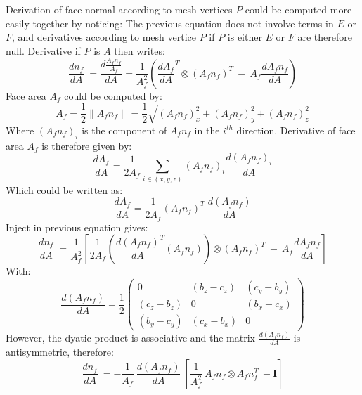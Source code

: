 \documentclass[11pt]{article}
\begin{document}
Derivation of face normal according to mesh vertices $P$ could be computed more easily together by noticing:
The previous equation does not involve terms in $E$ or $F$, and derivatives according to mesh vertice $P$ if $P$ is either $E$ or $F$ are therefore null. Derivative if $P$ is $A$ then writes:
\begin{equation}
\frac{d n_f}{dA}\ = \frac{d \frac{A_f n_f}{A_f}}{dA} = 
\frac{1}{A_f^2} \left( \frac{d A_f}{dA}^T \otimes (A_f n_f)^T\ -\ A_f \frac{d A_f n_f}{dA}
\right)
\end{equation}
Face area $A_f$ could be computed by:
\begin{equation}
A_f = \frac{1}{2} \| A_f n_f \| = \frac{1}{2} \sqrt{(A_f n_f)_x^2 + (A_f n_f)_y^2 + (A_f n_f)_z^2}
\end{equation}
Where $(A_f n_f)_i$ is the component of $A_f n_f$ in the $i^{th}$ direction. Derivative of face area $A_f$ is therefore given by:
\begin{equation}
\frac{d A_f}{dA} = \frac{1}{2 A_f} \sum_{i \in (x,y,z)} (A_f n_f)_i \frac{d (A_f n_f)_i}{dA} 
\end{equation}
Which could be written as:
\begin{equation}
\frac{d A_f}{dA} = \frac{1}{2 A_f} (A_f n_f)^T\ \frac{d (A_f n_f)}{dA} 
\end{equation}
Inject in previous equation gives:
\begin{equation}
\frac{d n_f}{dA}\ = 
\frac{1}{A_f^2} \left[ \frac{1}{2 A_f} \left(\frac{d (A_f n_f)}{dA}^T (A_f n_f) \right) \otimes (A_f n_f)^T\ -\ A_f \frac{d A_f n_f}{dA}
\right]
\end{equation}
With:
\begin{equation}
\frac{d (A_f n_f)}{dA} = \frac{1}{2}
\begin{pmatrix}
0 & (b_z-c_z) & (c_y-b_y) \\
(c_z-b_z) & 0 & (b_x-c_x) \\
(b_y-c_y) & (c_x-b_x) & 0
\end{pmatrix}
\end{equation}
However, the dyatic product is associative and the matrix $\frac{d (A_f n_f)}{dA}$ is antisymmetric, therefore:
\begin{equation}
\frac{d n_f}{dA}\ = 
- \frac{1}{A_f}\ \frac{d (A_f n_f)}{dA}\ \left[ \frac{1}{A_f^2}\ A_f n_f \otimes A_f n_f^T\ - \boldsymbol{I}
\right]
\end{equation}
\end{document}
